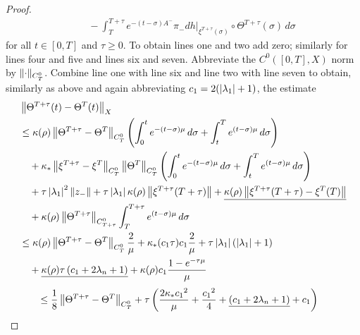 \documentclass{article}
\begin{document}
\begin{proof}
\begin{equation*}
\begin{split}
    &\quad
     -\int_T^{T+\tau}
     e^{-(t-\sigma)A^-}\pi_-
     dh|_{\xi^{T+\tau}(\sigma)}\circ \Theta^{T+\tau}(\sigma)
     \, d\sigma
\end{split}
\end{equation*}
for all $t\in[0,T]$ and $\tau\ge0$. To obtain lines one and two add zero; similarly
for lines four and five and lines six and seven. Abbreviate the $C^0([0,T],X)$ norm
by $\mathopen\|\cdot\mathclose\|_{C^0_T}$. Combine line one with line six and line two
with line seven to obtain, similarly as above and again abbreviating
${c_1}=2(\mathopen|\lambda_1\mathclose|+1)$, the estimate
\begin{equation*}
\begin{split}
    &\left\|\Theta^{T+\tau}(t)-\Theta^T(t)\right\|_X
   \\
    &\le \kappa(\rho)\left\|\Theta^{T+\tau}-\Theta^T\right\|_{C^0_T}
     \left(\int_0^t e^{-(t-\sigma)\mu}\, d\sigma+\int_t^T e^{(t-\sigma)\mu}\, d\sigma\right)
   \\
    &\quad
     +\kappa_*\left\|\xi^{T+\tau}-\xi^T\right\|_{C^0_T}\left\|\Theta^T\right\|_{C^0_T}
     \left(\int_0^t e^{-(t-\sigma)\mu}\, d\sigma+\int_t^T e^{(t-\sigma)\mu}\, d\sigma\right)
   \\
    &\quad
     +\tau\left|\lambda_1\right|^2\left\|{z_-}\right\|
     +\tau\left|\lambda_1\right|\kappa(\rho)\left\|\xi^{T+\tau}(T+\tau)\right\|
     +
\underline{
     \kappa(\rho)\left\|\xi^{T+\tau}(T+\tau)-\xi^T(T)\right\|
}
   \\
    &\quad
     +\kappa(\rho)\left\|\Theta^{T+\tau}\right\|_{C^0_{T+\tau}}
     \int_T^{T+\tau} e^{(t-\sigma)\mu}\, d\sigma
   \\
    &\le \kappa(\rho)\left\|\Theta^{T+\tau}-\Theta^T\right\|_{C^0_T}\frac{2}{\mu}
     +\kappa_*({c_1}\tau){c_1} \frac{2}{\mu}
     +\tau\left|\lambda_1\right|\left(\left|\lambda_1\right|+1\right)
   \\
    &\quad
     +
\underline{
     \kappa(\rho)\tau\left(c_1+2\lambda_n+1\right)
}
     +\kappa(\rho) {c_1}\frac{1-e^{-\tau\mu}}{\mu}
   \\
\end{split}
\end{equation*}
\begin{equation*}
\begin{split}
    &\le\frac{1}{8}
     \left\|\Theta^{T+\tau}-\Theta^T\right\|_{C^0_T}
     +\tau\left(\frac{2\kappa_*{c_1}^2}{\mu}+\frac{{c_1}^2}{4}
     +
\underline{
     \left(c_1+2\lambda_n+1\right)
}
     +{c_1}\right)
\end{split}
\end{equation*}

\end{proof}
\end{document}
